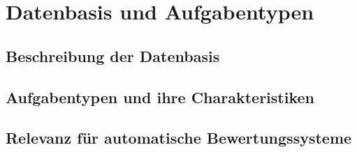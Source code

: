 \section{Datenbasis und Aufgabentypen}

\subsection{Beschreibung der Datenbasis}

\subsection{Aufgabentypen und ihre Charakteristiken}

\subsection{Relevanz für automatische Bewertungssysteme}